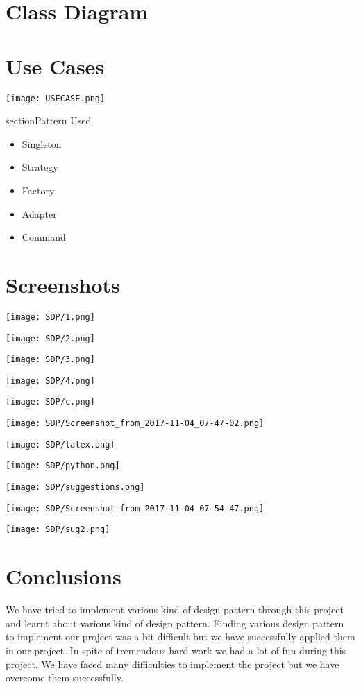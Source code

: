 \documentclass[a4paper]{article}
\begin{document}
\section{Class Diagram}

\section{Use Cases}
 \texttt{[image: USECASE.png]}
  
  \label{fig:USECASE}
section{Pattern Used}
\begin{itemize}
\item Singleton
\item Strategy
\item Factory
\item Adapter
\item Command
\end{itemize}
\section{Screenshots}
 \texttt{[image: SDP/1.png]}
  
  \label{fig:1}
  
   \texttt{[image: SDP/2.png]}
  
  \label{fig:2}
   \texttt{[image: SDP/3.png]}
  
  \label{fig:3}
   \texttt{[image: SDP/4.png]}
  
  \label{fig:4}
   \texttt{[image: SDP/c.png]}
  
  \label{fig:c}
   \texttt{[image: SDP/Screenshot\_from\_2017-11-04\_07-47-02.png]}
  
  \label{fig:5}
  
  \texttt{[image: SDP/latex.png]}
  
  \label{fig:7}
  \texttt{[image: SDP/python.png]}
  
  \label{fig:8}

  \texttt{[image: SDP/suggestions.png]}
  
  \label{fig:10}
    \texttt{[image: SDP/Screenshot\_from\_2017-11-04\_07-54-47.png]}
  
  \label{fig:6}
    \texttt{[image: SDP/sug2.png]}
  
  \label{fig:9}
\section{Conclusions}
We have tried to implement various kind of design pattern through this project and learnt about various kind of design pattern. Finding various design pattern to implement our project was a bit difficult but we have successfully applied them in our project. In spite of tremendous hard work we had a lot of fun during this project. We have faced many difficulties to implement the project but we have overcome them successfully. 
\end{document}
